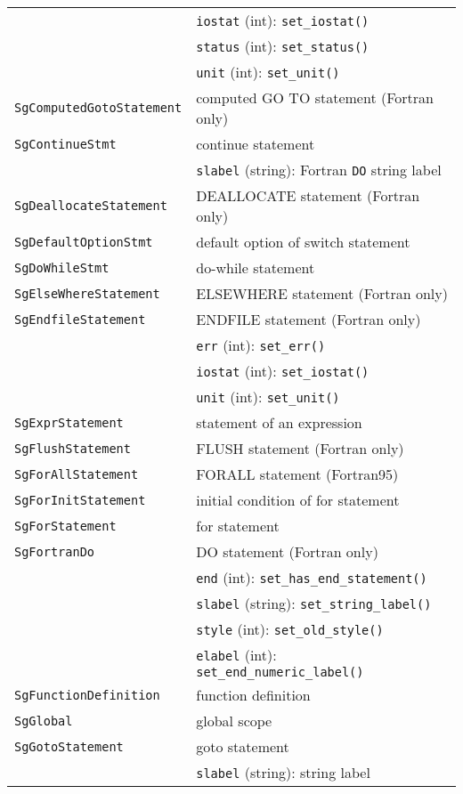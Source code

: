 \begin{longtable}[l]{l|p{10cm}}
 & \texttt{iostat} (int): \texttt{set\_iostat()}\\
 & \texttt{status} (int): \texttt{set\_status()}\\
 & \texttt{unit} (int): \texttt{set\_unit()}\\
 \texttt{SgComputedGotoStatement}& computed GO TO statement (Fortran only)\\
 \texttt{SgContinueStmt}& continue statement\\
 & \texttt{slabel} (string): Fortran \texttt{DO} string label\\
 \texttt{SgDeallocateStatement}& DEALLOCATE statement (Fortran only)\\
 \texttt{SgDefaultOptionStmt}& default option of switch statement\\
 \texttt{SgDoWhileStmt}& do-while statement\\
 \texttt{SgElseWhereStatement}& ELSEWHERE statement (Fortran only)\\
 \texttt{SgEndfileStatement}& ENDFILE statement (Fortran only)\\
 & \texttt{err} (int): \texttt{set\_err()}\\
 & \texttt{iostat} (int): \texttt{set\_iostat()}\\
 & \texttt{unit} (int): \texttt{set\_unit()}\\
 \texttt{SgExprStatement}& statement of an expression\\
 \texttt{SgFlushStatement}& FLUSH statement (Fortran only)\\
 \texttt{SgForAllStatement}& FORALL statement (Fortran95)\\
 \texttt{SgForInitStatement}& initial condition of for statement\\
 \texttt{SgForStatement}& for statement\\
 \texttt{SgFortranDo}& DO statement (Fortran only)\\
 & \texttt{end} (int): \texttt{set\_has\_end\_statement()}\\
 & \texttt{slabel} (string): \texttt{set\_string\_label()}\\
 & \texttt{style} (int): \texttt{set\_old\_style()}\\
 & \texttt{elabel} (int): \texttt{set\_end\_numeric\_label()}\\
 \texttt{SgFunctionDefinition}& function definition\\
 \texttt{SgGlobal}& global scope\\
 \texttt{SgGotoStatement}& goto statement\\
 & \texttt{slabel} (string): string label\\

\end{longtable}
